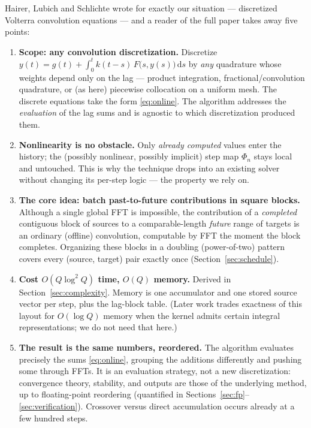 \documentclass[11pt]{article}
\newcommand{\dd}{\,\mathrm{d}}
\begin{document}
Hairer, Lubich and Schlichte wrote for exactly our situation ---
discretized Volterra convolution equations --- and a reader of the full
paper takes away five points:

\begin{enumerate}
\item \textbf{Scope: any convolution discretization.} Discretize
  $y(t)=g(t)+\int_0^t k(t-s)\,F\bigl(s,y(s)\bigr)\dd s$ by \emph{any}
  quadrature whose weights depend only on the lag --- product
  integration, fractional/convolution quadrature, or (as here)
  piecewise collocation on a uniform mesh. The discrete equations take
  the form \eqref{eq:online}. The algorithm addresses the
  \emph{evaluation} of the lag sums and is agnostic to which
  discretization produced them.
\item \textbf{Nonlinearity is no obstacle.} Only \emph{already
  computed} values enter the history; the (possibly nonlinear,
  possibly implicit) step map $\Phi_n$ stays local and untouched. This
  is why the technique drops into an existing solver without changing
  its per-step logic --- the property we rely on.
\item \textbf{The core idea: batch past-to-future contributions in
  square blocks.} Although a single global FFT is impossible, the
  contribution of a \emph{completed} contiguous block of sources to a
  comparable-length \emph{future} range of targets is an ordinary
  (offline) convolution, computable by FFT the moment the block
  completes. Organizing these blocks in a doubling (power-of-two)
  pattern covers every (source, target) pair exactly once
  (Section~\ref{sec:schedule}).
\item \textbf{Cost $O(Q\log^2 Q)$ time, $O(Q)$ memory.} Derived in
  Section~\ref{sec:complexity}. Memory is one accumulator and one
  stored source vector per step, plus the lag-block table. (Later work
  \cite{schadle2006} trades exactness of this layout for $O(\log Q)$
  memory when the kernel admits certain integral representations; we do
  not need that here.)
\item \textbf{The result is the same numbers, reordered.} The
  algorithm evaluates precisely the sums \eqref{eq:online}, grouping
  the additions differently and pushing some through FFTs. It is an
  evaluation strategy, not a new discretization: convergence theory,
  stability, and outputs are those of the underlying method, up to
  floating-point reordering (quantified in
  Sections~\ref{sec:fp}--\ref{sec:verification}). Crossover versus
  direct accumulation occurs already at a few hundred steps.
\end{enumerate}
\end{document}
